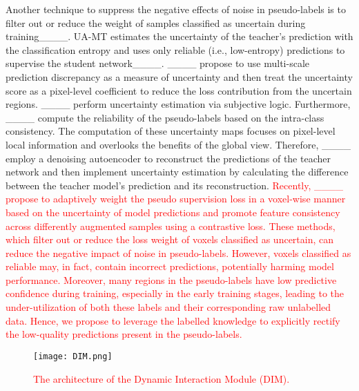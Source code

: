 Another technique to suppress the negative effects of noise in pseudo-labels is to filter out or reduce the weight of samples classified as uncertain during training____. UA-MT estimates the uncertainty of the teacher's prediction with the classification entropy and uses only reliable (i.e., low-entropy) predictions to supervise the student network____. ____ propose to use multi-scale prediction discrepancy as a measure of uncertainty and then treat the uncertainty score as a pixel-level coefficient to reduce the loss contribution from the uncertain regions. ____ perform uncertainty estimation via subjective logic. Furthermore, ____ compute the reliability of the pseudo-labels based on the intra-class consistency. 
The computation of these uncertainty maps focuses on pixel-level local information and overlooks the benefits of the global view. Therefore, ____ employ a denoising autoencoder to reconstruct the predictions of the teacher network and then implement uncertainty estimation by calculating the difference between the teacher model's prediction and its reconstruction. \textcolor{red}{Recently, ____ propose to adaptively weight the pseudo supervision loss in a voxel-wise manner based on the uncertainty of model predictions and promote feature consistency across differently augmented samples using a contrastive loss. These methods, which filter out or reduce the loss weight of voxels classified as uncertain, can reduce the negative impact of noise in pseudo-labels. However, voxels classified as reliable may, in fact, contain incorrect predictions, potentially harming model performance. Moreover, many regions in the pseudo-labels have low predictive confidence during training, especially in the early training stages, leading to the under-utilization of both these labels and their corresponding raw unlabelled data. Hence, we propose to leverage the labelled knowledge to explicitly rectify the low-quality predictions present in the pseudo-labels.}
\begin{figure}[!t]
\centering
\texttt{[image: DIM.png]}
\caption{\textcolor{red}{The architecture of the Dynamic Interaction Module (DIM).}}
\label{fig:dim}
\end{figure}